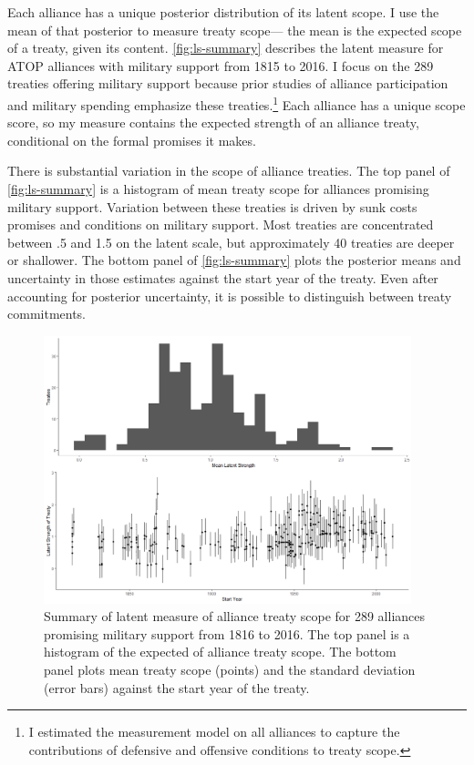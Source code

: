 \documentclass[12pt]{article}
\begin{document}
Each alliance has a unique posterior distribution of its latent scope. 
I use the mean of that posterior to measure treaty scope--- the mean is the expected scope of a treaty, given its content. 
\autoref{fig:ls-summary} describes the latent measure for ATOP alliances  with military support from 1815 to 2016.
I focus on the 289 treaties offering military support because prior studies of alliance participation and military spending emphasize these treaties.\footnote{
I estimated the measurement model on all alliances to capture the contributions of defensive and offensive conditions to treaty scope.}
Each alliance has a unique scope score, so my measure contains the expected strength of an alliance treaty, conditional on the formal promises it makes. 


There is substantial variation in the scope of alliance treaties. 
The top panel of \autoref{fig:ls-summary} is a histogram of mean treaty scope for alliances promising military support. 
Variation between these treaties is driven by sunk costs promises and conditions on military support. 
Most treaties are concentrated between .5 and 1.5 on the latent scale, but approximately 40 treaties are deeper or shallower. 
The bottom panel of \autoref{fig:ls-summary} plots the posterior means and uncertainty in those estimates against the start year of the treaty. 
Even after accounting for posterior uncertainty, it is possible to distinguish between treaty commitments. 


\begin{figure}
	\centering
		\includegraphics[width=0.95\textwidth]{../figures/ls-summary.png}
	\caption{Summary of latent measure of alliance treaty scope for 289 alliances promising military support from 1816 to 2016. The top panel is a histogram of the expected of alliance treaty scope. The bottom panel plots mean treaty scope (points) and the standard deviation (error bars) against the start year of the treaty.}
	\label{fig:ls-summary}
\end{figure}
\end{document}
